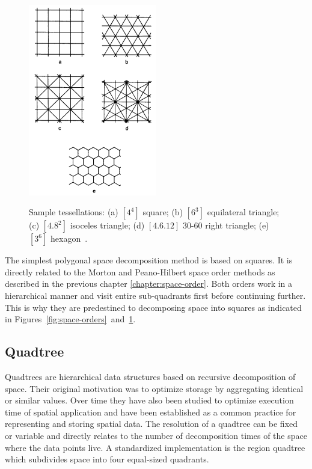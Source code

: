 \begin{figure}[h]
  \begin{center}
    \includegraphics[width=0.5\textwidth]{figures/space_decompositions.png}
    \label{fig:space-decompositions}
    \caption{Sample tessellations: (a) $[4^4]$ square; (b) $[6^3]$ equilateral triangle; (c) $[4.8^2]$ isoceles triangle; (d) $[4.6.12]$ 30-60 right triangle; (e) $[3^6]$ hexagon~\cite[p 17]{Samet90spatialdata}.}
  \end{center}
\end{figure}

The simplest polygonal space decomposition method is based on squares. It is directly related to the Morton and Peano-Hilbert space order methods as described in the previous chapter \ref{chapter:space-order}. Both orders work in a hierarchical manner and visit entire sub-quadrants first before continuing further. This is why they are predestined to decomposing space into squares as indicated in Figures~\ref{fig:space-orders}~and~\ref{fig:space-decompositions}.

\subsection{Quadtree}

Quadtrees are hierarchical data structures based on recursive decomposition of space. Their original motivation was to optimize storage by aggregating identical or similar values. Over time they have also been studied to optimize execution time of spatial application and have been established as a common practice for representing and storing spatial data. The resolution of a quadtree can be fixed or variable and directly relates to the number of decomposition times of the space where the data points live. A standardized implementation is the region quadtree which subdivides space into four equal-sized quadrants.

